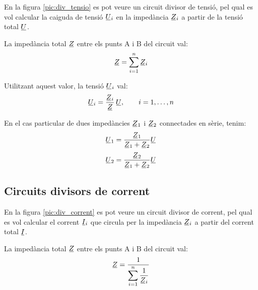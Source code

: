 En la figura \vref{pic:div_tensio} es pot veure un circuit divisor
de tensió, pel qual es vol calcular la caiguda de tensió
$\cmplx{U}_i$ en la impedància $\cmplx{Z}_i$ a partir de la tensió total $\cmplx{U}$.

\begin{center}
	\centering
    
    \label{pic:div_tensio}
\end{center}

La impedància total $\cmplx{Z}$ entre els punts A i B del circuit val:
\begin{equation}\label{eq:z_serie}
    \cmplx{Z} = \sum_{i=1}^n \cmplx{Z}_i
\end{equation}

Utilitzant aquest valor, la tensió $\cmplx{U}_i$ val:
\begin{equation}
    \cmplx{U}_i = \frac{\cmplx{Z}_i}{\cmplx{Z}}\,\cmplx{U}, \qquad i=1,\dots,n\label{eq:div_tensio}
\end{equation}

En el cas particular de dues impedàncies $\cmplx{Z}_1$ i $\cmplx{Z}_2$ connectades en sèrie, tenim:
\begin{subequations}
\begin{align}
    \cmplx{U}_1 &= \frac{\cmplx{Z}_1}{\cmplx{Z}_1+\cmplx{Z}_2} \cmplx{U}  \\[0.5ex]
    \cmplx{U}_2 &= \frac{\cmplx{Z}_2}{\cmplx{Z}_1+\cmplx{Z}_2} \cmplx{U}
\end{align}
\end{subequations}

\subsection{Circuits divisors de corrent}\label{sec:circ-div-corr}

En la figura \vref{pic:div_corrent} es pot veure un circuit divisor
de corrent, pel qual es vol calcular el corrent $\cmplx{I}_i$ que
circula per la impedància $\cmplx{Z}_i$ a partir del corrent total
$\cmplx{I}$.
\begin{center}
	\centering
    
    \label{pic:div_corrent}
\end{center}

La impedància total $\cmplx{Z}$ entre els punts A i B del circuit val:
\begin{equation}\label{eq:z_parallel}
    \cmplx{Z} = \frac{1}{\displaystyle\sum_{i=1}^n \frac{1}{\cmplx{Z}_i}}
\end{equation}


